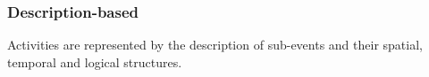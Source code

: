 \documentclass[a4paper, 12pt, openany, oneside]{book}
\begin{document}
\subsubsection{Description-based}
Activities are represented by the description of sub-events and their spatial, temporal and logical structures.








% 





\clearpage


%
\end{document}
